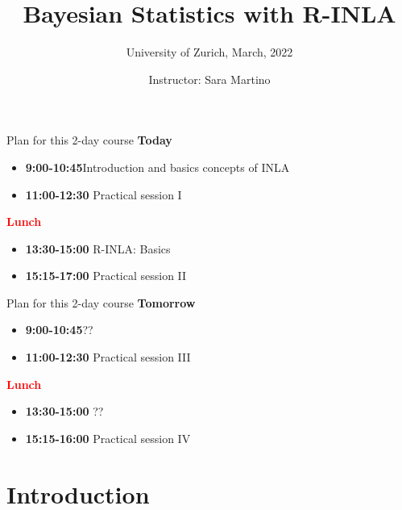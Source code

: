 \documentclass[
  ignorenonframetext,
]{beamer}
\title{Bayesian Statistics with R-INLA}
\subtitle{University of Zurich, March, 2022}
\author{Instructor: Sara Martino}
\date{}
\providecommand{\tightlist}{%
  \setlength{\itemsep}{0pt}\setlength{\parskip}{0pt}}
\begin{document}
\frame{\titlepage}

\begin{frame}[allowframebreaks]
  \tableofcontents[hideallsubsections]
\end{frame}
\begin{frame}
\end{frame}

\begin{frame}{Plan for this 2-day course}
\protect\hypertarget{plan-for-this-2-day-course}{}
\textbf{Today}

\begin{itemize}
\tightlist
\item
  \textbf{9:00-10:45}Introduction and basics concepts of INLA
\item
  \textbf{11:00-12:30} Practical session I
\end{itemize}

\textbf{\textcolor{red}{Lunch}}

\begin{itemize}
\tightlist
\item
  \textbf{13:30-15:00} R-INLA: Basics
\item
  \textbf{15:15-17:00} Practical session II
\end{itemize}
\end{frame}

\begin{frame}{Plan for this 2-day course}
\protect\hypertarget{plan-for-this-2-day-course-1}{}
\textbf{Tomorrow}

\begin{itemize}
\tightlist
\item
  \textbf{9:00-10:45}??
\item
  \textbf{11:00-12:30} Practical session III
\end{itemize}

\textbf{\textcolor{red}{Lunch}}

\begin{itemize}
\tightlist
\item
  \textbf{13:30-15:00} ??
\item
  \textbf{15:15-16:00} Practical session IV
\end{itemize}
\end{frame}

\hypertarget{introduction}{%
\section{Introduction}\label{introduction}}
\end{document}

